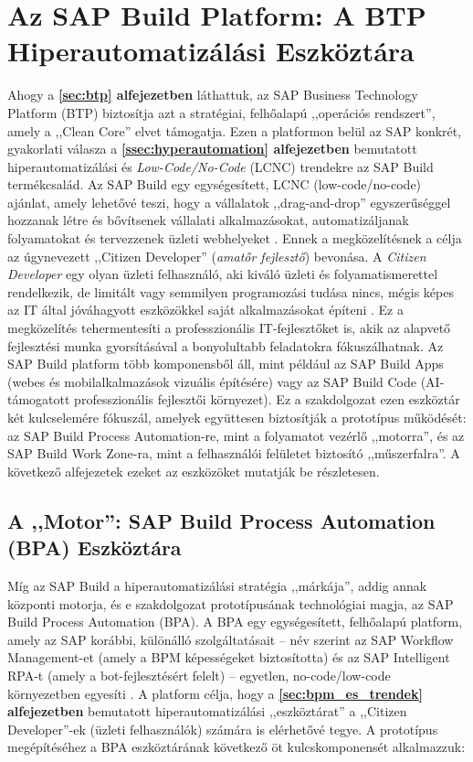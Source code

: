 \section{Az SAP Build Platform: A BTP Hiperautomatizálási Eszköztára}
\label{sec:sap_build}

Ahogy a \textbf{\ref{sec:btp} alfejezetben} láthattuk, az SAP Business Technology Platform (BTP) biztosítja azt a stratégiai, felhőalapú ,,operációs rendszert'', amely a ,,Clean Core'' elvet támogatja.
Ezen a platformon belül az SAP konkrét, gyakorlati válasza a \textbf{\ref{ssec:hyperautomation} alfejezetben} bemutatott hiperautomatizálási és \textit{Low-Code/No-Code} (LCNC) trendekre az SAP Build termékcsalád.
Az SAP Build egy egységesített, LCNC (low-code/no-code) ajánlat, amely lehetővé teszi, hogy a vállalatok ,,drag-and-drop'' egyszerűséggel hozzanak létre és bővítsenek vállalati alkalmazásokat, automatizáljanak folyamatokat és tervezzenek üzleti webhelyeket \cite{SAP-Demystifying-SAP-Build}.
Ennek a megközelítésnek a célja az úgynevezett ,,Citizen Developer'' (\textit{amatőr fejlesztő}) bevonása.
A \textit{Citizen Developer} egy olyan üzleti felhasználó, aki kiváló üzleti és folyamatismerettel rendelkezik, de limitált vagy semmilyen programozási tudása nincs, mégis képes az IT által jóváhagyott eszközökkel saját alkalmazásokat építeni \cite{SAP-Demystifying-SAP-Build}.
Ez a megközelítés tehermentesíti a professzionális IT-fejlesztőket is, akik az alapvető fejlesztési munka gyorsításával a bonyolultabb feladatokra fókuszálhatnak.
Az SAP Build platform több komponensből áll, mint például az SAP Build Apps (webes és mobilalkalmazások vizuális építésére) vagy az SAP Build Code (AI-támogatott professzionális fejlesztői környezet).
Ez a szakdolgozat ezen eszköztár két kulcselemére fókuszál, amelyek együttesen biztosítják a prototípus működését: az SAP Build Process Automation-re, mint a folyamatot vezérlő ,,motorra'', és az SAP Build Work Zone-ra, mint a felhasználói felületet biztosító ,,műszerfalra''.
A következő alfejezetek ezeket az eszközöket mutatják be részletesen.


\subsection{A ,,Motor'': SAP Build Process Automation (BPA) Eszköztára}
\label{ssec:bpa_motor}

Míg az SAP Build a hiperautomatizálási stratégia ,,márkája'', addig annak központi motorja, és e szakdolgozat prototípusának technológiai magja, az SAP Build Process Automation (BPA).
A BPA egy egységesített, felhőalapú platform, amely az SAP korábbi, különálló szolgáltatásait – név szerint az SAP Workflow Management-et (amely a BPM képességeket biztosította) és az SAP Intelligent RPA-t (amely a bot-fejlesztésért felelt) – egyetlen, no-code/low-code környezetben egyesíti \cite{SAP-BPA-Features}.
A platform célja, hogy a \textbf{\ref{sec:bpm_es_trendek} alfejezetben} bemutatott hiperautomatizálási ,,eszköztárat'' a ,,Citizen Developer''-ek (üzleti felhasználók) számára is elérhetővé tegye.
A prototípus megépítéséhez a BPA eszköztárának következő öt kulcskomponensét alkalmazzuk:

